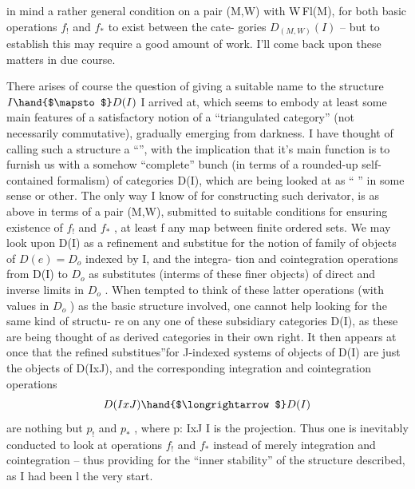  in
 mind a rather general condition on a pair (M,W) with W\hand{$\subset$}\,Fl(M), for
both basic operations $f_!$ and $f_*$ to exist between the  cate-%
gories $D_{(M,W)}(I)$ -- but to establish this   may require a good amount
of work. I'll come back upon these matters in due course.

There arises of course the question of giving a suitable name to the
structure $I \hand{$\mapsto$} D(I)$ I arrived at, which seems to embody at least some
main features of a satisfactory notion of a ``triangulated category'' (not
necessarily commutative), gradually emerging from darkness. I have
thought of calling such a structure a ``\hand{\uline{\textcolor{black}{derivator}}}'', with the implication
that it's main function is to furnish us with a somehow\hand{,} ``complete'' bunch
(in terms of a rounded-up self-contained formalism) of categories D(I),
which are being looked at as ``\hand{\uline{\textcolor{black}{derived}}} \hand{\uline{\textcolor{black}{categories}}}'' in some sense or other.
The only way I know of for constructing such derivator, is as above in
terms of a pair (M,W), submitted to suitable conditions for ensuring
existence of $f_!$ and $f_*$ , at least  f  any map between finite ordered
sets. We may look upon D(I) as a  refinement and substitue for the
notion of family of objects of $D(e) = D_o$ indexed by I, and the integra-%
tion and cointegration operations from D(I) to $D_o$ as substitutes (interms
of these finer objects) of direct and inverse limits in $D_o$ . When tempted
to think of these latter operations (with values in $D_o$ ) as the basic
structure involved, one cannot help  looking for the same kind of structu-%
re on any one of these subsidiary categories D(I), as these are being
thought of as derived categories in their own right. It then appears at
once that the  refined substitues''\hand{/}for J-indexed systems of objects of D(I)
are just the objects of D(IxJ), and the corresponding integration and
cointegration operations
\[ D(IxJ) \hand{$\longrightarrow$} D(I) \]
are nothing but $p_!$ and $p_*$ , where p: IxJ \hand{$\longrightarrow$} I is the projection. Thus
one is inevitably conducted to look at operations $f_!$ and $f_*$ instead of
merely integration and cointegration -- thus providing for the ``inner
stability'' of the structure described, as I had been l
the very start.


